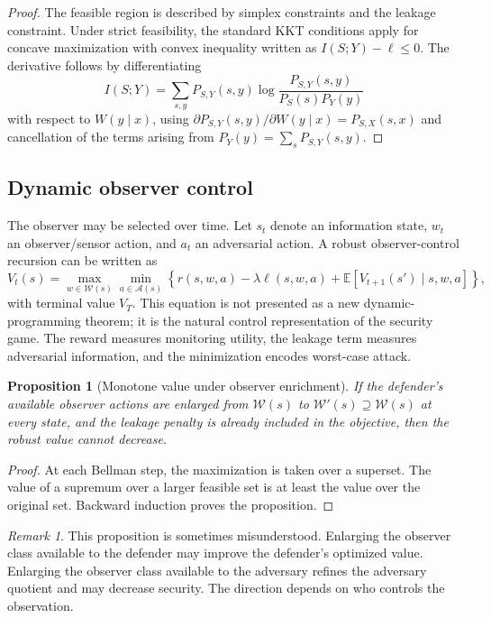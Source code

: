 \documentclass[11pt]{article}
\theoremstyle{definition}
\theoremstyle{plain}
\newtheorem{proposition}[definition]{Proposition}
\theoremstyle{remark}
\newtheorem{remark}[definition]{Remark}
\newcommand{\E}{\mathbb{E}}
\newcommand{\cA}{\mathcal{A}}
\newcommand{\cW}{\mathcal{W}}
\begin{document}
\begin{proof}
The feasible region is described by simplex constraints and the leakage constraint. Under strict feasibility, the standard KKT conditions apply for concave maximization with convex inequality written as $I(S;Y)-\ell\le0$. The derivative follows by differentiating
\[
I(S;Y)=\sum_{s,y}P_{S,Y}(s,y)\log\frac{P_{S,Y}(s,y)}{P_S(s)P_Y(y)}
\]
with respect to $W(y\mid x)$, using $\partial P_{S,Y}(s,y)/\partial W(y\mid x)=P_{S,X}(s,x)$ and cancellation of the terms arising from $P_Y(y)=\sum_sP_{S,Y}(s,y)$.
\end{proof}

\subsection{Dynamic observer control}

The observer may be selected over time. Let $s_t$ denote an information state, $w_t$ an observer/sensor action, and $a_t$ an adversarial action. A robust observer-control recursion can be written as
\[
    V_t(s)=\max_{w\in\cW(s)}\min_{a\in\cA(s)}\left\{r(s,w,a)-\lambda \ell(s,w,a)+\E[V_{t+1}(s')\mid s,w,a]\right\},
\]
with terminal value $V_T$. This equation is not presented as a new dynamic-programming theorem; it is the natural control representation of the security game. The reward measures monitoring utility, the leakage term measures adversarial information, and the minimization encodes worst-case attack.

\begin{proposition}[Monotone value under observer enrichment]
If the defender's available observer actions are enlarged from $\cW(s)$ to $\cW'(s)\supseteq\cW(s)$ at every state, and the leakage penalty is already included in the objective, then the robust value cannot decrease.
\end{proposition}

\begin{proof}
At each Bellman step, the maximization is taken over a superset. The value of a supremum over a larger feasible set is at least the value over the original set. Backward induction proves the proposition.
\end{proof}

\begin{remark}
This proposition is sometimes misunderstood. Enlarging the observer class available to the defender may improve the defender's optimized value. Enlarging the observer class available to the adversary refines the adversary quotient and may decrease security. The direction depends on who controls the observation.
\end{remark}
\end{document}
